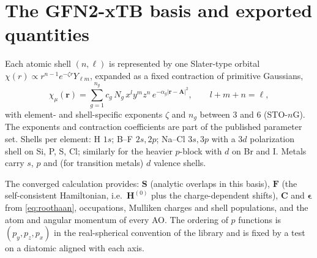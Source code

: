 \documentclass[11pt,a4paper]{article}
\newcommand{\vb}[1]{\bm{#1}}
\begin{document}
\section{The GFN2-xTB basis and exported quantities}
\label{app:gfn2}
Each atomic shell $(n,\ell)$ is represented by one Slater-type orbital $\chi(r)\propto r^{n-1}e^{-\zeta r}Y_{\ell m}$, expanded as a fixed contraction of primitive Gaussians,
\begin{equation}
\chi_\mu(\vb{r})=\sum_{g=1}^{n_g} c_{g}\,N_g\,x^{l}y^{m}z^{n}\,e^{-\alpha_g|\vb{r}-\vb{A}|^2},\qquad l+m+n=\ell,
\end{equation}
with element- and shell-specific exponents $\zeta$ and $n_g$ between 3 and 6 (STO-$n$G). The exponents and contraction coefficients are part of the published parameter set. Shells per element: H $1s$; B--F $2s,2p$; Na--Cl $3s,3p$ with a $3d$ polarization shell on Si, P, S, Cl; similarly for the heavier $p$-block with $d$ on Br and I. Metals carry $s$, $p$ and (for transition metals) $d$ valence shells.

The converged calculation provides: $\vb{S}$ (analytic overlaps in this basis), $\vb{F}$ (the self-consistent Hamiltonian, i.e.\ $\vb{H}^{(0)}$ plus the charge-dependent shifts), $\vb{C}$ and $\vb{\epsilon}$ from \eqref{eq:roothaan}, occupations, Mulliken charges and shell populations, and the atom and angular momentum of every AO. The ordering of $p$ functions is $(p_y,p_z,p_x)$ in the real-spherical convention of the library and is fixed by a test on a diatomic aligned with each axis.
\end{document}
